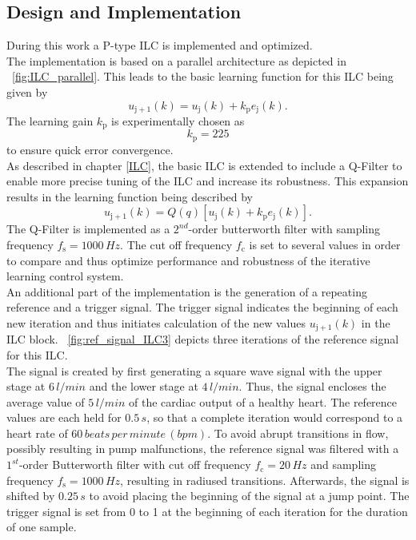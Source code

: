 \subsection{Design and Implementation}
During this work a P-type ILC is implemented and optimized.
\\The implementation is based on a parallel architecture as depicted in \figurename~\ref{fig:ILC_parallel}. This leads to the basic learning function for this ILC being given by
\begin{equation}
  u_{\mathrm{j+1}}(k) = u_{\mathrm{j}}(k)+k_{\mathrm{p}}e_{\mathrm{j}}(k).
\end{equation}
The learning gain $k_{\mathrm{p}}$ is experimentally chosen as
\begin{equation}
  k_{\mathrm{p}} = 225
\end{equation}
to ensure quick error convergence.
\\As described in chapter \ref{ILC}, the basic ILC is extended to include a Q-Filter to enable more precise tuning of the ILC and increase its robustness.
This expansion results in the learning function being described by
\begin{equation}
  u_{\mathrm{j+1}}(k) = Q(q)[u_{\mathrm{j}}(k)+k_{\mathrm{p}}e_{\mathrm{j}}(k)].
\end{equation}
The Q-Filter is implemented as a $2^{nd}$-order butterworth filter with sampling frequency $f_{\mathrm{s}}=1000\,Hz$. The cut off frequency $f_{\mathrm{c}}$ is set to several values in order to compare and thus optimize performance and robustness of the iterative learning control system.
\\An additional part of the implementation is the generation of a repeating reference and a trigger signal. The trigger signal indicates the beginning of each new iteration and thus initiates calculation of the new values $u_{\mathrm{j+1}}(k)$ in the ILC block.
\figurename~\ref{fig:ref_signal_ILC3} depicts three iterations of the reference signal for this ILC.
\\The signal is created by first generating a square wave signal with the upper stage at $6\, l/min$ and the lower stage at $4\, l/min$. Thus, the signal encloses the average value of $5\, l/min$ of the cardiac output of a healthy heart. The reference values are each held for $0.5\, s$, so that a complete iteration would correspond to a heart rate of $60\, beats\, per\, minute\, (bpm)$. To avoid abrupt transitions in flow, possibly resulting in pump malfunctions, the reference signal was filtered with a $1^{st}$-order Butterworth filter with cut off frequency $f_{\mathrm{c}}=20\,Hz$ and sampling frequency $f_{\mathrm{s}}=1000\,Hz$, resulting in radiused transitions. Afterwards, the signal is shifted by $0.25\, s$ to avoid placing the beginning of the signal at a jump point. The trigger signal is set from 0 to 1 at the beginning of each iteration for the duration of one sample.
